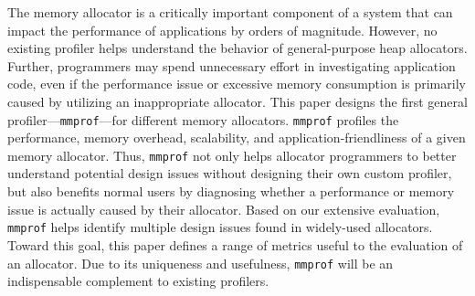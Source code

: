 The memory allocator is a critically important component of a system that can impact the performance of applications by orders of magnitude. However, no existing profiler helps understand the behavior of general-purpose heap allocators. Further, programmers may spend unnecessary effort in investigating application code, even if the performance issue or excessive memory consumption is primarily caused by utilizing an inappropriate allocator. This paper designs the first general profiler---\texttt{mmprof}---for different memory allocators. \texttt{mmprof} profiles the performance, memory overhead, scalability, and application-friendliness of a given memory allocator. Thus, \texttt{mmprof} not only helps allocator programmers to better understand potential design issues without designing their own custom profiler, but also benefits normal users by diagnosing whether a performance or memory issue is actually caused by their allocator. Based on our extensive evaluation, \texttt{mmprof} helps identify multiple design issues found in widely-used allocators. Toward this goal, this paper defines a range of metrics useful to the evaluation of an allocator. Due to its uniqueness and usefulness, \texttt{mmprof} will be an indispensable complement to existing profilers. 

 